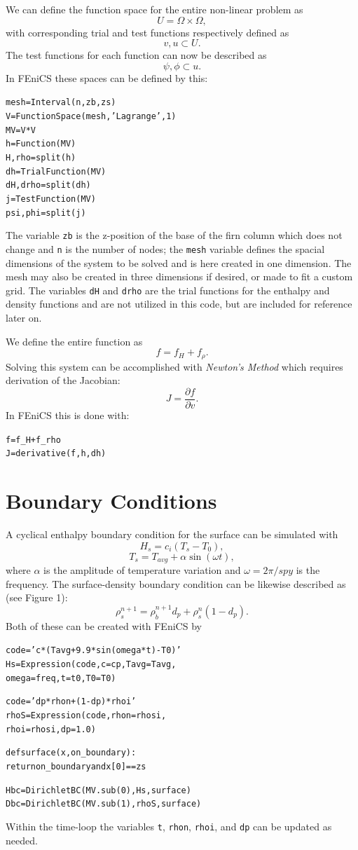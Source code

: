 \documentclass{article}%
\begin{document}
We can define the function space for the entire non-linear problem as 
  $$
    U = \Omega \times \Omega,
  $$
with corresponding trial and test functions respectively defined as
  $$
    v, u \subset U.
  $$
The test functions for each function can now be described as
  $$
    \psi, \phi \subset u.
  $$
In FEniCS these spaces can be defined by this:
\footnotesize
\begin{alltt}
mesh     = Interval(n, zb, zs)
V        = FunctionSpace(mesh, 'Lagrange', 1)
MV       = V*V
h        = Function(MV)
H,rho    = split(h)    
dh       = TrialFunction(MV)
dH, drho = split(dh)
j        = TestFunction(MV)
psi, phi = split(j)
\end{alltt}
\normalsize
The variable \texttt{zb} is the z-position of the base of the firn column which does not change and \texttt{n} is the number of nodes; the \texttt{mesh} variable defines the spacial dimensions of the system to be solved and is here created in one dimension.  The mesh may also be created in three dimensions if desired, or made to fit a custom grid.  The variables \texttt{dH} and \texttt{drho} are the trial functions for the enthalpy and density functions and are not utilized in this code, but are included for reference later on.

We define the entire function as 
  $$
    f = f_H + f_{\rho}.
  $$
Solving this system can be accomplished with \emph{Newton's Method} which requires derivation of the Jacobian:
  $$
    J = \frac{\partial f}{\partial v}.
  $$
In FEniCS this is done with:
\footnotesize
\begin{alltt}
f  = f_H + f_rho
J  = derivative(f, h, dh)
\end{alltt}
\normalsize


\section{Boundary Conditions}

A cyclical enthalpy boundary condition for the surface can be simulated with 
  $$
    H_s = c_i ( T_s - T_0 ),
  $$
  $$
    T_s = T_{avg} + \alpha \sin(\omega t),
  $$
where $\alpha$ is the amplitude of temperature variation and $\omega = 2\pi / spy$ is the frequency.  The surface-density boundary condition can be likewise described as (see Figure 1): 
  $$
    \rho_s^{n+1} = \rho_{\dot{b}}^{n+1} d_p + \rho_s^{n} (1 - d_p).
  $$
Both of these can be created with FEniCS by
\footnotesize
\begin{alltt}
code = 'c*(Tavg + 9.9*sin(omega*t) - T0)'
Hs   = Expression(code, c=cp, Tavg=Tavg, 
                  omega=freq, t=t0, T0=T0)

code = 'dp*rhon + (1 - dp)*rhoi'
rhoS = Expression(code, rhon=rhosi, 
                  rhoi=rhosi, dp=1.0)

def surface(x, on_boundary):
  return on_boundary and x[0] == zs

Hbc  = DirichletBC(MV.sub(0), Hs, surface)
Dbc  = DirichletBC(MV.sub(1), rhoS, surface)
\end{alltt}
\normalsize
Within the time-loop the variables \texttt{t}, \texttt{rhon}, \texttt{rhoi}, and \texttt{dp} can be updated as needed.
\end{document}
